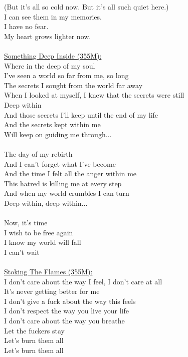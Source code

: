 \documentclass[11pt]{article}
\begin{document}
(But it's all so cold now. But it's all such quiet here.)\\
I can see them in my memories.\\
I have no fear.\\
My heart grows lighter now.\\
\\
\underline{Something Deep Inside (355M):}\\
Where in the deep of my soul\\
I've seen a world so far from me, so long\\
The secrets I sought from the world far away\\
When I looked at myself, I knew that the secrets were still\\
Deep within\\
And those secrets I'll keep until the end of my life\\
And the secrets kept within me\\
Will keep on guiding me through...\\
\\
The day of my rebirth\\
And I can't forget what I've become\\
And the time I felt all the anger within me\\
This hatred is killing me at every step\\
And when my world crumbles I can turn\\
Deep within, deep within...\\
\\
Now, it's time\\
I wish to be free again\\
I know my world will fall\\
I can't wait\\
\\
\underline{Stoking The Flames (355M):}\\
I don't care about the way I feel, I don't care at all\\
It's never getting better for me\\
I don't give a fuck about the way this feels\\
I don't respect the way you live your life\\
I don't care about the way you breathe\\
Let the fuckers stay\\
Let's burn them all\\
Let's burn them all\\
\\
\end{document}
